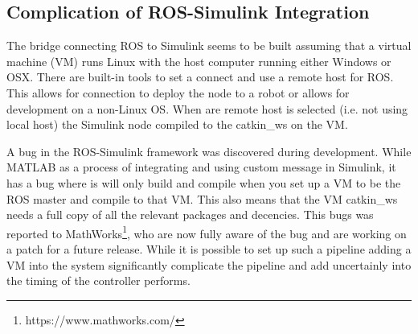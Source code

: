 



\subsection{Complication of ROS-Simulink Integration}

The bridge connecting ROS to Simulink seems to be built assuming that a virtual machine (VM) runs Linux with the host computer running either Windows or OSX. There are built-in tools to set a connect and use a remote host for ROS. This allows for connection to deploy the node to a robot or allows for development on a non-Linux OS. When are remote host is selected (i.e. not using local host) the Simulink node compiled to the catkin\_ws on the VM. 

A bug in the ROS-Simulink framework was discovered during development. While MATLAB as a process of integrating and using custom message in Simulink, it has a bug where is will only build and compile when you set up a VM to be the ROS master and compile to that VM. This also means that the VM catkin\_ws needs a full copy of all the relevant packages and decencies. This bugs was reported to MathWorks\footnote{https://www.mathworks.com/}, who are now fully aware of the bug and are working on a patch for a future release. While it is possible to set up such a pipeline adding a VM into the system significantly complicate the pipeline and add uncertainly into the timing of the controller performs. 








